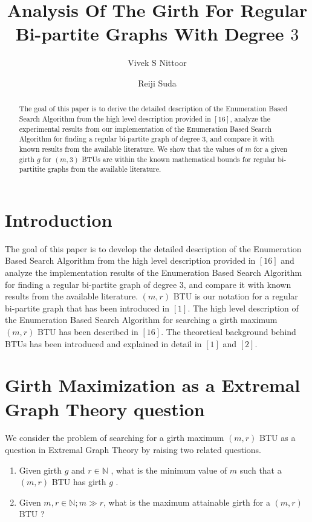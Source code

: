 \documentclass{llncs}
\begin{document}
\title{Analysis Of The Girth For Regular Bi-partite Graphs With Degree $3$}

\author{Vivek S Nittoor \and Reiji Suda}


\maketitle
\begin{abstract}
The goal of this paper is to derive the detailed description of the Enumeration Based Search Algorithm from the high level description provided in $[16]$, analyze the experimental results from our implementation of the Enumeration Based Search Algorithm for finding a regular bi-partite graph of degree $3$, and compare it with known results from the available literature. We show that the values of $m$ for a given girth $g$ for $(m, 3)$ BTUs are within the known mathematical bounds for regular bi-partitite graphs from the available literature. 
\end{abstract}

\section{Introduction}
The goal of this paper is to develop the detailed description of the Enumeration Based Search Algorithm from the high level description provided in $[16]$ and analyze the implementation results of the Enumeration Based Search Algorithm for finding a regular bi-partite graph of degree $3$, and compare it with known results from the available literature. $(m, r)$ BTU is our notation for a regular bi-partite graph that has been introduced in $[1]$. The high level description of the Enumeration Based Search Algorithm for searching a girth maximum $(m, r)$ BTU has been described in $[16]$. The theoretical background behind BTUs has been introduced and  explained in detail in $[1]$ and $[2]$.

\section {Girth Maximization as a Extremal Graph Theory question}

We consider the problem of searching for a girth maximum $(m,r)$ BTU as a question in Extremal Graph Theory by raising two related questions.
\begin{enumerate}
\item Given girth $g$ and  $r\in \mathbb{N}$ , what is the minimum value of  $m$ such that a $(m,r)$ BTU has girth $g$  .
\item Given  $m,r\in \mathbb{N};m\gg r$, what is the maximum attainable girth for a $(m,r)$ BTU ?
\end{enumerate}
\end{document}
